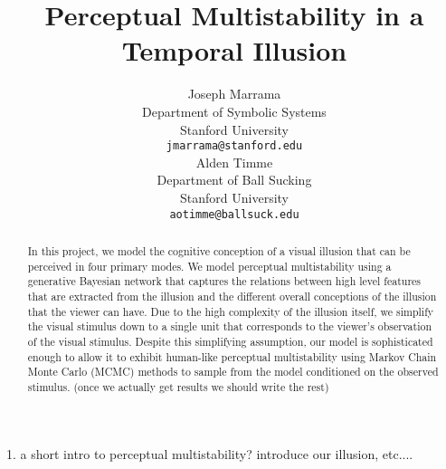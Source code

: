 \documentclass{article} %
\title{Perceptual Multistability in a Temporal Illusion}
\author{
Joseph Marrama \\
Department of Symbolic Systems\\
Stanford University\\
\texttt{jmarrama@stanford.edu} \\
\And
Alden Timme \\
Department of Ball Sucking \\
Stanford University \\
\texttt{aotimme@ballsuck.edu} \\
}
\begin{document}
\maketitle

\begin{abstract}
In this project, we model the cognitive conception of a visual illusion that can be perceived in four primary modes. 
We model perceptual multistability using a generative Bayesian network that captures the relations between high level features that are extracted from the illusion and the different overall conceptions of the illusion that the viewer can have.
Due to the high complexity of the illusion itself, we simplify the visual stimulus down to a single unit that corresponds to the viewer's observation of the visual stimulus.
Despite this simplifying assumption, our model is sophisticated enough to allow it to exhibit human-like perceptual multistability using Markov Chain Monte Carlo (MCMC) methods to sample from the model conditioned on the observed stimulus. (once we actually get results we should write the rest) 


\end{abstract}



1. a short intro to perceptual multistability? introduce our illusion, etc....
\end{document}
